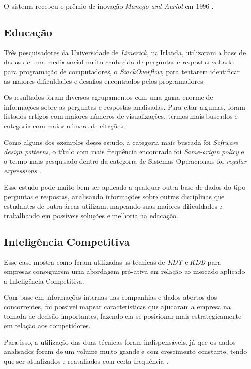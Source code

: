 \documentclass[conference]{IEEEtran}
\begin{document}
O sistema recebeu o prêmio de inovação \textit{Manago and Auriol} em 1996 \cite{art9}.

\subsection{Educação}
Três pesquisadores da Universidade de \textit{Limerick}, na Irlanda, utilizaram a base de dados de uma media social muito conhecida de perguntas e respostas voltado para programação de computadores, o \textit{StackOverflow}, para tentarem identificar as maiores dificuldades e desafios encontrados pelos programadores. 

Os resultados foram diversos agrupamentos com uma gama enorme de informações sobre as perguntas e respostas analisadas. Para citar algumas, foram listados artigos com maiores números de visualizações, termos mais buscados e categoria com maior número de citações.

Como alguns dos exemplos desse estudo, a categoria mais buscada foi  \textit{Software design patterns}, o título com mais frequência encontrada foi \textit{Same-origin policy} e o termo mais pesquisado dentro da categoria de Sistemas Operacionais foi \textit{regular expressions} \cite{art3}.

Esse estudo pode muito bem ser aplicado a qualquer outra base de dados do tipo perguntas e respostas, analisando informações sobre outras disciplinas que estudantes de outra áreas utilizam, mapeando suas maiores dificuldades e trabalhando em possíveis soluções e melhoria na educação.

\subsection{Inteligência Competitiva}
Esse caso mostra como foram utilizadas as técnicas de \textit{KDT} e \textit{KDD} para empresas conseguirem uma abordagem pró-ativa em relação ao mercado aplicado a Inteligência Competitiva.

Com base em informações internas das companhias e dados abertos dos concorrentes, foi possível mapear características que ajudaram a empresa na tomada de decisão importantes, fazendo ela se posicionar mais estrategicamente em relação aos competidores.

Para isso, a utilização das duas técnicas foram indispensáveis, já que os dados analisados foram de um volume muito grande e com crescimento constante, tendo que ser atualizados e reavaliados com certa frequência \cite{art7}.
\end{document}
